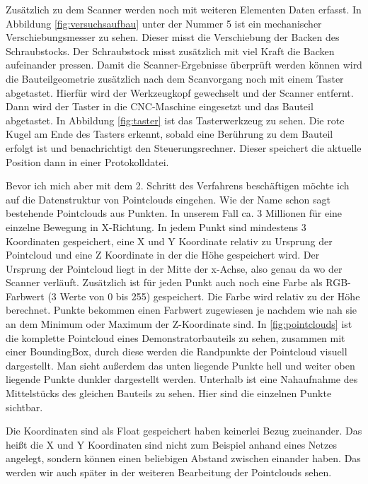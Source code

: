 \documentclass[../main.tex]{subfiles}
\begin{document}
Zusätzlich zu dem Scanner werden noch mit weiteren Elementen Daten erfasst.
In Abbildung \ref{fig:versuchsaufbau} unter der Nummer 5 ist ein mechanischer 
Verschiebungsmesser zu sehen. Dieser misst die Verschiebung der Backen des 
Schraubstocks. Der Schraubstock misst zusätzlich mit viel Kraft die Backen 
aufeinander pressen. Damit die Scanner-Ergebnisse überprüft werden können 
wird die Bauteilgeometrie zusätzlich nach dem Scanvorgang noch mit einem Taster
abgetastet. Hierfür wird der Werkzeugkopf gewechselt und der Scanner entfernt.
Dann wird der Taster in die CNC-Maschine eingesetzt und das Bauteil abgetastet.
In Abbildung \ref{fig:taster} ist das Tasterwerkzeug zu sehen. Die rote Kugel 
am Ende des Tasters erkennt, sobald eine Berührung zu dem Bauteil erfolgt ist 
und benachrichtigt den Steuerungsrechner. Dieser speichert die aktuelle Position 
dann in einer Protokolldatei. 

Bevor ich mich aber mit dem 2. Schritt des Verfahrens beschäftigen möchte ich auf die 
Datenstruktur von Pointclouds eingehen. Wie der Name schon sagt bestehende
Pointclouds aus Punkten. In unserem Fall ca. 3 Millionen für eine einzelne
Bewegung in X-Richtung. In jedem Punkt sind mindestens 3 Koordinaten gespeichert, 
eine X und Y Koordinate relativ zu Ursprung der Pointcloud und eine Z Koordinate 
in der die Höhe gespeichert wird. Der Ursprung der Pointcloud liegt in der Mitte 
der x-Achse, also genau da wo der Scanner verläuft.
Zusätzlich ist für jeden Punkt auch noch eine Farbe als RGB-Farbwert
(3 Werte von 0 bis 255) gespeichert. Die Farbe wird relativ zu der Höhe
berechnet. Punkte bekommen einen Farbwert zugewiesen je nachdem wie nah 
sie an dem Minimum oder Maximum der Z-Koordinate sind. 
In \ref{fig:pointclouds} ist die komplette Pointcloud eines Demonstratorbauteils 
zu sehen, zusammen mit einer BoundingBox, durch diese werden die Randpunkte
der Pointcloud visuell dargestellt. Man sieht außerdem das unten liegende Punkte
hell und weiter oben liegende Punkte dunkler dargestellt werden.
Unterhalb ist eine Nahaufnahme des Mittelstücks des gleichen Bauteils zu sehen. 
Hier sind die einzelnen Punkte sichtbar.

Die Koordinaten sind als Float gespeichert haben keinerlei Bezug zueinander.
Das heißt die X und Y Koordinaten sind nicht zum Beispiel anhand eines Netzes
angelegt, sondern können einen beliebigen Abstand zwischen einander haben. Das
werden wir auch später in der weiteren Bearbeitung der Pointclouds sehen.
\end{document}

